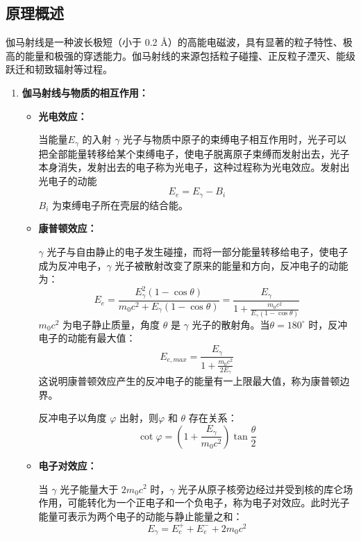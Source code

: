 \documentclass[dvipsnames, svgnames,a4paper,11pt]{article}
\begin{document}
\subsection{原理概述}

	伽马射线是一种波长极短（小于 0.2 \AA）的高能电磁波，具有显著的粒子特性、极高的能量和极强的穿透能力。伽马射线的来源包括粒子碰撞、正反粒子湮灭、能级跃迁和韧致辐射等过程。

	
	\begin{enumerate}
		\item \textbf{伽马射线与物质的相互作用：}

			\begin{itemize}
				\item \textbf{光电效应：}
				
					当能量$E_{\gamma}$ 的入射 $\gamma$ 光子与物质中原子的束缚电子相互作用时，光子可以把全部能量转移给某个束缚电子，使电子脱离原子束缚而发射出去，光子本身消失，发射出去的电子称为光电子，这种过程称为光电效应。发射出光电子的动能
					\[
						E_e = E_{\gamma} - B_i
					\]
					$B_i$ 为束缚电子所在壳层的结合能。
		
		
				\item \textbf{康普顿效应：}
				
					$\gamma$ 光子与自由静止的电子发生碰撞，而将一部分能量转移给电子，使电子成为反冲电子，$\gamma$ 光子被散射改变了原来的能量和方向，反冲电子的动能为：
					\[
						E_e = \frac{E_{\gamma}^2 (1 - \cos\theta)}{m_0 c^2 + E_{\gamma}(1 - \cos\theta)} = \frac{E_{\gamma}}{1 + \frac{m_0 c^2}{E_{\gamma} (1 - \cos\theta)}}
					\]
					$m_0 c^2$ 为电子静止质量，角度 $\theta$ 是 $\gamma$ 光子的散射角。当$\theta = 180^\circ$ 时，反冲电子的动能有最大值：
					\[
						E_{e,max} = \frac{E_\gamma}{1 + \frac{m_0 c^2}{2 E_\gamma}}
					\]
					这说明康普顿效应产生的反冲电子的能量有一上限最大值，称为康普顿边界。
					
					反冲电子以角度 $\varphi$ 出射，则$\varphi$ 和 $\theta$ 存在关系：
					\[
						\cot\varphi = (1 + \frac{E_{\gamma}}{m_0 c^2})\tan\frac{\theta}{2}
					\]
		
		
		
				\item \textbf{电子对效应：}
		
					当 $\gamma$ 光子能量大于 $2 m_0 c^2$ 时，$\gamma$ 光子从原子核旁边经过并受到核的库仑场作用，可能转化为一个正电子和一个负电子，称为电子对效应。此时光子能量可表示为两个电子的动能与静止能量之和：
					\[
						E_\gamma = E_e^+ + E_e^- + 2 m_0 c^2
					\]
		
		
		

\end{itemize}
\end{enumerate}
\end{document}
